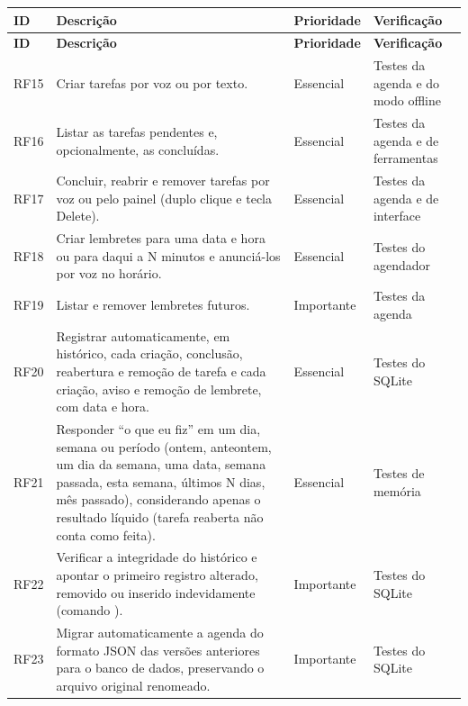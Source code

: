 \begin{singlespace}
\label{qua:rf-agenda}
\small
\begin{tabularx}{\textwidth}{|C{1.25cm}|L|C{2.0cm}|P{3.2cm}|}
\hline
\textbf{ID} & \textbf{Descrição} & \textbf{Prioridade} & \textbf{Verificação} \\ \hline
\endfirsthead
\hline
\textbf{ID} & \textbf{Descrição} & \textbf{Prioridade} & \textbf{Verificação} \\ \hline
\endhead
RF15 & Criar tarefas por voz ou por texto. & Essencial & Testes da agenda e do modo offline \\ \hline
RF16 & Listar as tarefas pendentes e, opcionalmente, as concluídas. & Essencial & Testes da agenda e de ferramentas \\ \hline
RF17 & Concluir, reabrir e remover tarefas por voz ou pelo painel (duplo clique e tecla Delete). & Essencial & Testes da agenda e de interface \\ \hline
RF18 & Criar lembretes para uma data e hora ou para daqui a N minutos e anunciá-los por voz no horário. & Essencial & Testes do agendador \\ \hline
RF19 & Listar e remover lembretes futuros. & Importante & Testes da agenda \\ \hline
RF20 & Registrar automaticamente, em histórico, cada criação, conclusão, reabertura e remoção de tarefa e
       cada criação, aviso e remoção de lembrete, com data e hora. & Essencial & Testes do SQLite \\ \hline
RF21 & Responder “o que eu fiz” em um dia, semana ou período (ontem, anteontem, um dia da semana, uma data,
       semana passada, esta semana, últimos N dias, mês passado), considerando apenas o resultado
       líquido (tarefa reaberta não conta como feita). & Essencial & Testes de memória \\ \hline
RF22 & Verificar a integridade do histórico e apontar o primeiro registro alterado, removido ou inserido
       indevidamente (comando ). & Importante & Testes do SQLite \\ \hline
RF23 & Migrar automaticamente a agenda do formato JSON das versões anteriores para o banco de dados,
       preservando o arquivo original renomeado. & Importante & Testes do SQLite \\ \hline
\end{tabularx}
\end{singlespace}


